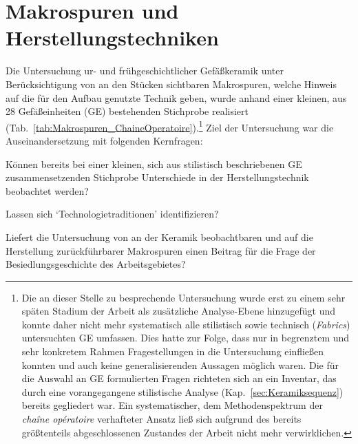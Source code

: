 \section{Makrospuren und Herstellungstechniken}\label{sec:Herstellung2_Toepferei}

Die Untersuchung ur- und frühgeschichtlicher Gefäßkeramik unter Berücksichtigung von an den Stücken sichtbaren Makrospuren, welche Hinweis auf die für den Aufbau genutzte Technik geben, wurde anhand einer kleinen, aus 28 Gefäßeinheiten (GE) bestehenden Stichprobe realisiert (Tab.~\ref{tab:Makrospuren_ChaineOperatoire}).\footnote{Die an dieser Stelle zu besprechende Untersuchung wurde erst zu einem sehr späten Stadium der Arbeit als zusätzliche Analyse-Ebene hinzugefügt und konnte daher nicht mehr systematisch alle stilistisch sowie technisch (\textit{Fabrics}) untersuchten GE umfassen. Dies hatte zur Folge, dass nur in begrenztem und sehr konkretem Rahmen Fragestellungen in die Untersuchung einfließen konnten und auch keine generalisierenden Aussagen möglich waren. Die für die Auswahl an GE formulierten Fragen richteten sich an ein Inventar, das durch eine vorangegangene stilistische Analyse (Kap.~\ref{sec:Keramiksequenz}) bereits gegliedert war. Ein systematischer, dem Methodenspektrum der \textit{chaîne opératoire} verhafteter Ansatz \parencite[siehe][25f.]{Ard.2014} ließ sich aufgrund des bereits größtenteils abgeschlossenen Zustandes der Arbeit nicht mehr verwirklichen.} Ziel der Untersuchung war die Auseinandersetzung mit folgenden Kernfragen:
\begin{itemize*}
	\renewcommand\labelitemi{--}
	\item Können bereits bei einer kleinen, sich aus stilistisch beschriebenen GE zusammensetzenden Stichprobe Unterschiede in der Herstellungstechnik beobachtet werden?
	\item Lassen sich \enquote*{Technologietraditionen} identifizieren?
	\item Liefert die Untersuchung von an der Keramik beobachtbaren und auf die Herstellung zurückführbarer Makrospuren einen Beitrag für die Frage der Besiedlungsgeschichte des Arbeitsgebietes?
\end{itemize*}


